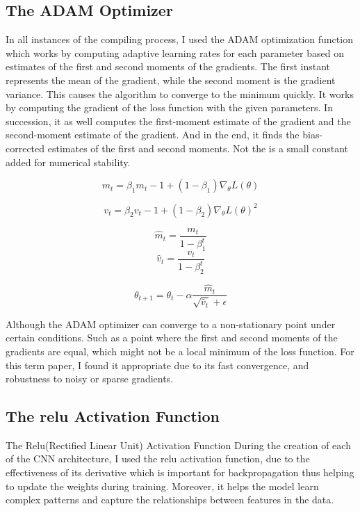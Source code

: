 \documentclass[twocolumn]{article}
\begin{document}
\newcommand{\grad}{\nabla_\theta L(\theta)}
\newcommand{\mt}{m_t}
\newcommand{\vt}{v_t}
\newcommand{\mhat}{\hat{m}_t}
\newcommand{\vhat}{\hat{v}_t}
\newcommand{\eps}{\epsilon}
\newcommand{\lr}{\alpha}
\newcommand{\betaone}{\beta_1}
\newcommand{\betatwo}{\beta_2}

\subsection{The ADAM Optimizer}
In all instances of the compiling process, I used the ADAM optimization function which works by computing adaptive learning rates for each parameter based on estimates of the first and second moments of the gradients.\cite{reddi2019convergence} The first instant represents the mean of the gradient, while the second moment is the gradient variance. This causes the algorithm to converge to the minimum quickly.
It works by computing the gradient of the loss function with the given parameters. \cite{kingma2014method} In succession, it as well computes the first-moment estimate of the gradient and the second-moment estimate of the gradient. And in the end, it finds the bias-corrected estimates of the first and second moments. Not the  is a small constant added for numerical stability.


\[\mt = \betaone\mt-1 + (1-\betaone)\grad\]

\[\vt = \betatwo\vt-1 + (1-\betatwo)\grad^2\]

\[\mhat = \frac{\mt}{1-\betaone^t}\]
\[\vhat = \frac{\vt}{1-\betatwo^t}\]

\[\theta_{t+1} = \theta_t - \lr\frac{\mhat}{\sqrt{\vhat} + \eps}\]

Although the ADAM optimizer can converge to a non-stationary point under certain conditions.\cite{ruder2016overview} Such as a point where the first and second moments of the gradients are equal, which might not be a local minimum of the loss function. For this term paper, I found it appropriate due to its fast convergence, and robustness to noisy or sparse gradients.

\subsection{The relu Activation Function}
The Relu(Rectified Linear Unit) Activation Function
During the creation of each of the CNN architecture, I used the relu activation function, due to the effectiveness of its derivative which is important for backpropagation thus helping to update the weights during training. Moreover, it helps the model learn complex patterns and capture the relationships between features in the data.
\end{document}
